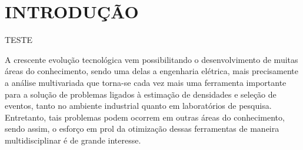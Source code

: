 \chapter{INTRODUÇÃO}





\label{cap:intro}
TESTE

A crescente evolução tecnológica vem possibilitando o desenvolvimento de muitas áreas do conhecimento, sendo uma delas a engenharia elétrica, mais precisamente a análise multivariada \cite{vicini2005analise} que torna-se cada vez mais uma ferramenta importante para a solução de problemas ligados à estimação de densidades e seleção de eventos, tanto no ambiente industrial quanto em laboratórios de pesquisa. Entretanto, tais problemas podem ocorrem em outras áreas do conhecimento, sendo assim, o esforço em prol da otimização dessas ferramentas de maneira multidisciplinar é de grande interesse.

